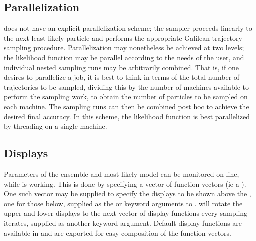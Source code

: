 \subsection{Parallelization}
 does not have an explicit parallelization scheme; the sampler proceeds linearly to the next least-likely particle and performs the appropriate Galilean trajectory sampling procedure. Parallelization may nonetheless be achieved at two levels; the likelihood function may be parallel according to the needs of the user, and individual nested sampling runs may be arbitrarily combined. That is, if one desires to parallelize a  job, it is best to think in terms of the total number of trajectories to be sampled, dividing this by the number of machines available to perform the sampling work, to obtain the number of particles to be sampled on each machine. The sampling runs can then be combined post hoc to achieve the desired final accuracy. In this scheme, the likelihood function is best parallelized by threading on a single machine.

\subsection{Displays}
Parameters of the ensemble and most-likely model can be monitored on-line, while  is working. This is done by specifying a vector of function vectors (ie a ). One such vector may be supplied to specify the displays to be shown above the , one for those below, supplied as the  or  keyword arguments to .  will rotate the upper and lower displays to the next vector of display functions every  sampling iterates, supplied as another  keyword argument. Default display functions are available in  and are exported for easy composition of the function vectors.

